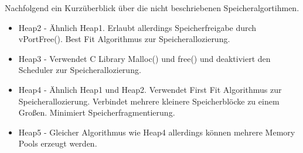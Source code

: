 Nachfolgend ein Kurzüberblick über die nicht beschriebenen Speicheralgortihmen.  
\begin{itemize}
	\item Heap2 - Ähnlich Heap1. Erlaubt allerdings Speicherfreigabe durch vPortFree(). Best Fit Algorithmus zur Speicherallozierung. 
	\item Heap3 - Verwendet C Library Malloc() und free() und deaktiviert den Scheduler zur Speicherallozierung.
	\item Heap4 - Ähnlich Heap1 und Heap2. Verwendet First Fit Algorithmus zur Speicherallozierung. Verbindet mehrere kleinere Speicherblöcke zu einem Großen. Minimiert Speicherfragmentierung.
	\item Heap5 - Gleicher Algorithmus wie Heap4 allerdings kön\-nen mehrere Memory Pools erzeugt werden.
\end{itemize}
